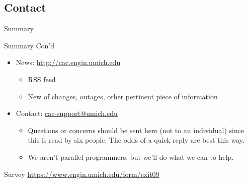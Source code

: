 \documentclass[handout]{beamer}
\begin{document}
\subsection{Contact}
\begin{frame}{Summary}
 \begin{block}{Summary Con'd}
 \begin{itemize}
 \item News: \url{http://cac.engin.umich.edu}
   \begin{itemize}
    \item RSS feed
    \item New of changes, outages, other pertinent piece of information
   \end{itemize}
  \item Contact: \url{cac-support@umich.edu}
   \begin{itemize}
    \item Questions or concerns should be sent here (not to an individual) since
this is read by six people.  The odds of a quick reply are best this way.
    \item We aren't parallel programmers, but we'll do what we can to help.
   \end{itemize}
 \end{itemize}
 \end{block}
 \begin{block}{Survey}
    \url{https://www.engin.umich.edu/form/exit09}
 \end{block}
\end{frame}
\end{document}
